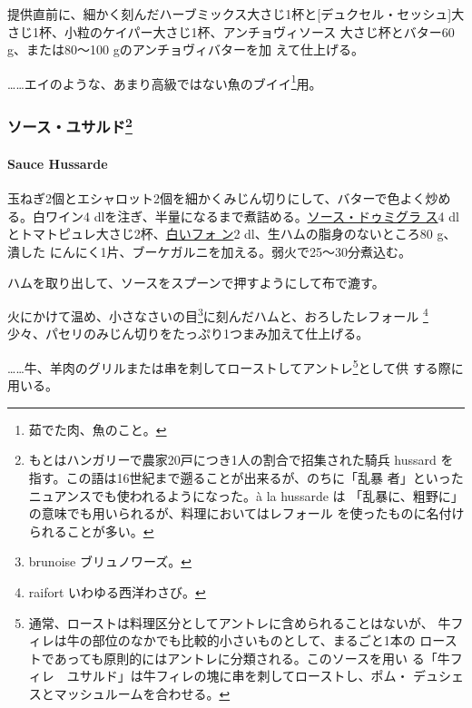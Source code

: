 \begin{recette}
提供直前に、細かく刻んだハーブミックス大さじ1杯と{[}デュクセル・セッシュ{]}大
さじ1\undemi{}杯、小粒のケイパー大さじ1\undemi{}杯、アンチョヴィソース
大さじ\undemi{}杯とバター60 g、または80〜100 gのアンチョヴィバターを加
えて仕上げる。

\ldots{}\ldots{}エイのような、あまり高級ではない魚のブイイ\footnote{茹でた肉、魚のこと。}用。

\maeaki

\hypertarget{ux30bdux30fcux30b9ux30e6ux30b5ux30ebux30c951}{%
\subsubsection[ソース・ユサルド]{\texorpdfstring{ソース・ユサルド\footnote{もとはハンガリーで農家20戸につき1人の割合で招集された騎兵
  hussard を指す。この語は16世紀まで遡ることが出来るが、のちに「乱暴
  者」といったニュアンスでも使われるようになった。à la hussarde は
  「乱暴に、粗野に」の意味でも用いられるが、料理においてはレフォール
  を使ったものに名付けられることが多い。}}{ソース・ユサルド}}\label{ux30bdux30fcux30b9ux30e6ux30b5ux30ebux30c951}}

\hypertarget{sauce-hussarde}{%
\paragraph{Sauce Hussarde}\label{sauce-hussarde}}


玉ねぎ2個とエシャロット2個を細かくみじん切りにして、バターで色よく炒め
る。白ワイン4
dlを注ぎ、半量になるまで煮詰める。\protect\hyperlink{sauce-demi-glace}{ソース・ドゥミグラ
ス}4
dlとトマトピュレ大さじ2杯、\protect\hyperlink{fonds-blanc-ordinaire}{白いフォ
ン}2 dl、生ハムの脂身のないところ80 g、潰した
にんにく1片、ブーケガルニを加える。弱火で25〜30分煮込む。

ハムを取り出して、ソースをスプーンで押すようにして布で漉す。

火にかけて温め、小さなさいの目\footnote{brunoise ブリュノワーズ。}に刻んだハムと、おろしたレフォール
\footnote{raifort いわゆる西洋わさび。}少々、パセリのみじん切りをたっぷり1つまみ加えて仕上げる。

\ldots{}\ldots{}牛、羊肉のグリルまたは串を刺してローストしてアントレ\footnote{通常、ローストは料理区分としてアントレに含められることはないが、
  牛フィレは牛の部位のなかでも比較的小さいものとして、まるごと1本の
  ローストであっても原則的にはアントレに分類される。このソースを用い
  る「牛フィレ　ユサルド」は牛フィレの塊に串を刺してローストし、ポム・
  デュシェスとマッシュルームを合わせる。}として供 する際に用いる。


\end{recette}
